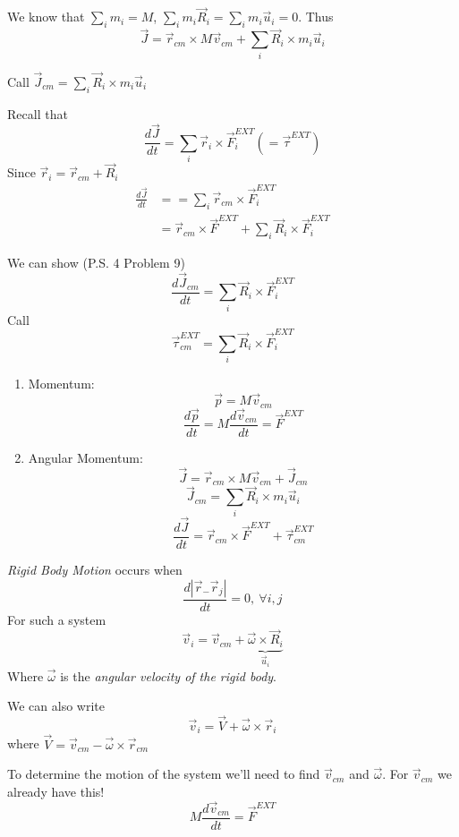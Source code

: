 \documentclass[twoside]{scrartcl}
\begin{document}
We know that $\sum_i m_i = M$, $\sum_i m_i\vec{R}_i = \sum_i m_i \vec{u}_i = 0$. Thus
\[\vec{J} = \vec{r}_{cm} \times M\vec{v}_{cm} + \sum_i\vec{R}_i\times m_i\vec{u}_i\]

Call $\vec{J}_{cm} = \sum_i \vec{R}_i \times m_i\vec{u}_i$

Recall that 
\[\frac{d\vec{J}}{dt} = \sum_i \vec{r}_i \times \vec{F}_i^{EXT} (= \vec{\tau}^{EXT})\]
Since $\vec{r}_i = \vec{r}_{cm} + \vec{R}_i$
\[\begin{aligned} \frac{d\vec{J}}{dt} &= = \sum_i \vec{r}_{cm} \times \vec{F}_i^{EXT}\\
&= \vec{r}_{cm} \times \vec{F}^{EXT} + \sum_i\vec{R}_i\times\vec{F}_i^{EXT}
\end{aligned}
\]

We can show (P.S. 4 Problem 9)
\[\frac{d\vec{J}_{cm}}{dt} = \sum_i\vec{R}_i\times\vec{F}_i^{EXT}\]
Call
\[\vec{\tau}_{cm}^{EXT} = \sum_i\vec{R}_i \times \vec{F}_i^{EXT}\]

\begin{enumerate}
\item Momentum: \[\vec{p} = M\vec{v}_{cm}\]
\[\frac{d\vec{p}}{dt} =  M\frac{d\vec{v}_{cm}}{dt} = \vec{F}^{EXT}\]
\item Angular Momentum: \[\vec{J} = \vec{r}_{cm} \times M\vec{v}_{cm} + \vec{J}_{cm}\]
\[\vec{J}_{cm} = \sum_i\vec{R}_i \times m_i\vec{u}_i\]
\[\frac{d\vec{J}}{dt} = \vec{r}_{cm} \times \vec{F}^{EXT} + \vec{\tau}_{cm}^{EXT}\]
\end{enumerate}












\begin{definition}
\emph{Rigid Body Motion} occurs when 
\[\frac{d|\vec{r}_- \vec{r}_j|}{dt} = 0,~ \forall i,j\]
For such a system
\[\vec{v}_i = \vec{v}_{cm} + \underbrace{\vec{\omega}\times\vec{R}_i}_{\vec{u}_i}\]	
Where $\vec{\omega}$ is the \emph{angular velocity of the rigid body}.

We can also write 
\[\vec{v}_i = \vec{V} + \vec{\omega}\times\vec{r}_i\]
where 
$\vec{V} = \vec{v}_{cm} - \vec{\omega}\times\vec{r}_{cm}$
\end{definition}

To determine the motion of the system we'll need to find $\vec{v}_{cm}$ and $\vec{\omega}$. For $\vec{v}_{cm}$ we already have this!
\begin{equation}M\frac{d\vec{v}_{cm}}{dt} = \vec{F}^{EXT}\end{equation}
\end{document}

